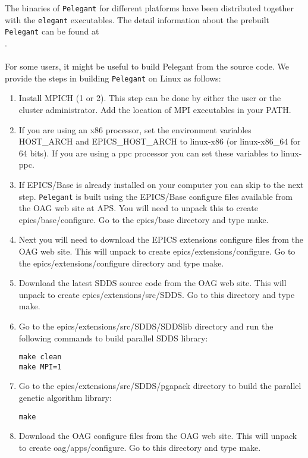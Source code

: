 \documentclass[11pt]{article}
\begin{document}
The binaries of {\tt Pelegant} for different platforms have been distributed together with the {\tt elegant} executables.
The detail information about the prebuilt {\tt Pelegant} can be found at \\
     .
\\\\
For some users, it might be useful to build Pelegant from the source code. We provide the steps in building {\tt Pelegant} on Linux as follows:
\begin{enumerate}
\item Install MPICH (1 or 2). This step can be done by either the user or the cluster administrator. Add the location of MPI executables in your PATH.
\item If you are using an x86 processor, set the environment variables HOST\_ARCH and EPICS\_HOST\_ARCH to linux-x86 (or linux-x86\_64 for 64 bits). If you are using a ppc processor you can set these variables to linux-ppc.
\item If EPICS/Base is already installed on your computer you can skip to the next step. {\tt Pelegant} is built using the EPICS/Base configure files available from the OAG web site at APS. You will need to unpack this to create epics/base/configure. Go to the epics/base directory and type make.
\item Next you will need to download the EPICS extensions configure files from the OAG web site. This will unpack to create epics/extensions/configure. Go to the epics/extensions/configure directory and type make.
\item Download the latest SDDS source code from the OAG web site. This will unpack to create epics/extensions/src/SDDS. Go to this directory and type make.
\item Go to the epics/extensions/src/SDDS/SDDSlib directory and run the following commands to build parallel SDDS library:
\begin{verbatim}
make clean
make MPI=1
\end{verbatim}
\item Go to the epics/extensions/src/SDDS/pgapack directory to build the parallel genetic algorithm library:
\begin{verbatim}
make
\end{verbatim}
\item Download the OAG configure files from the OAG web site. This will unpack to create oag/apps/configure. Go to this directory and type make.

\end{enumerate}
\end{document}
